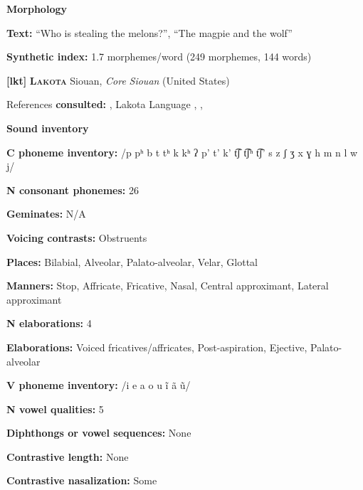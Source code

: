 \textbf{Morphology}



\textbf{Text:} “Who is stealing the melons?”, “The magpie and the wolf” \citep[448-456]{Haspelmath1993}



\textbf{Synthetic index:} 1.7 morphemes/word (249 morphemes, 144 words)



\textbf{[lkt]}   \textbf{\textsc{Lakota}}    Siouan, \textit{Core} \textit{Siouan} (United States)



References \textbf{consulted:} \citet{Ingham2003}, Lakota Language \citet{Consortium2008}, \citet{Mirzayan2010}, \citet{RoodTaylor1996}



\textbf{Sound inventory}



\textbf{C phoneme inventory:} /p pʰ b t tʰ k kʰ ʔ p’ t’ k’ t͡ʃ t͡ʃʰ t͡ʃ’ s z ʃ ʒ x ɣ h m n l w j/



\textbf{N consonant phonemes:} 26



\textbf{Geminates:} N/A



\textbf{Voicing contrasts:} Obstruents



\textbf{Places:} Bilabial, Alveolar, Palato-alveolar, Velar, Glottal



\textbf{Manners:} Stop, Affricate, Fricative, Nasal, Central approximant, Lateral approximant



\textbf{N elaborations:} 4



\textbf{Elaborations:} Voiced fricatives/affricates, Post-aspiration, Ejective, Palato-alveolar



\textbf{V phoneme inventory:} /i e a o u ĩ ã ũ/



\textbf{N vowel qualities:} 5



\textbf{Diphthongs or vowel sequences:} None



\textbf{Contrastive length:} None



\textbf{Contrastive nasalization:} Some



